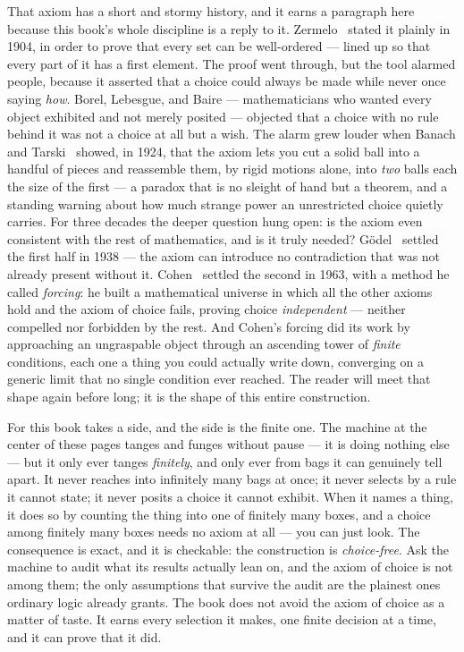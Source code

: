 That axiom has a short and stormy history, and it earns a paragraph here because this book's whole discipline is a
reply to it. Zermelo~\cite{zermelo1904} stated it plainly in 1904, in order to prove that every set can be
well-ordered --- lined up so that every part of it has a first element. The proof went through, but the tool alarmed
people, because it asserted that a choice could always be made while never once saying \emph{how}. Borel, Lebesgue,
and Baire --- mathematicians who wanted every object exhibited and not merely posited --- objected that a choice with
no rule behind it was not a choice at all but a wish. The alarm grew louder when Banach and Tarski~\cite{banachtarski1924} showed, in 1924, that the axiom lets you cut a solid ball into a handful of pieces and reassemble them,
by rigid motions alone, into \emph{two} balls each the size of the first --- a paradox that is no sleight of hand but a
theorem, and a standing warning about how much strange power an unrestricted choice quietly carries. For three decades
the deeper question hung open: is the axiom even consistent with the rest of mathematics, and is it truly needed?
G\"odel~\cite{godel1938} settled the first half in 1938 --- the axiom can introduce no contradiction that was not
already present without it. Cohen~\cite{cohen1963} settled the second in 1963, with a method he called \emph{forcing}:
he built a mathematical universe in which all the other axioms hold and the axiom of choice fails, proving choice
\emph{independent} --- neither compelled nor forbidden by the rest. And Cohen's forcing did its work by approaching an
ungraspable object through an ascending tower of \emph{finite} conditions, each one a thing you could actually write
down, converging on a generic limit that no single condition ever reached. The reader will meet that shape again
before long; it is the shape of this entire construction.

\medskip

For this book takes a side, and the side is the finite one. The machine at the center of these pages tanges and funges
without pause --- it is doing nothing else --- but it only ever tanges \emph{finitely}, and only ever from bags it can
genuinely tell apart. It never reaches into infinitely many bags at once; it never selects by a rule it cannot state;
it never posits a choice it cannot exhibit. When it names a thing, it does so by counting the thing into one of
finitely many boxes, and a choice among finitely many boxes needs no axiom at all --- you can just look. The
consequence is exact, and it is checkable: the construction is \emph{choice-free}. Ask the machine to audit what its
results actually lean on, and the axiom of choice is not among them; the only assumptions that survive the audit are
the plainest ones ordinary logic already grants. The book does not avoid the axiom of choice as a matter of taste. It
earns every selection it makes, one finite decision at a time, and it can prove that it did.

